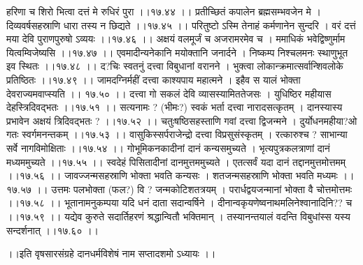 \documentclass[11pt]{book}
\begin{document}
\begin{landscape}
हरिणा च शिरो भित्वा दत्तं मे रुधिरं पुरा ।।१७.४४ ।।
प्रतीच्छितं कपालेन ब्रह्मसम्भवजेन मे ।
दिव्यवर्षसहस्राणि धारा तस्य न छिद्यते ।।१७.४५ ।।
परितुष्टो ऽस्मि तेनाहं कर्मणानेन सुन्दरि ।
वरं दत्तं मया देवि पुराणपुरुषो ऽव्ययः ।।१७.४६ ।।
अक्षयं वलमूर्जं च अजरामरमेव च ।
ममाधिकं भवेद्विष्णुर्माम यित्वम्विजेष्यसि ।।१७.४७ ।।
एवमादीन्यनेकानि मयोक्तानि जनार्दने ।
निष्कम्प निश्चलमनः स्थाणुभूत इव स्थितः ।।१७.४८ ।।
द?चिः स्वतनुं दत्त्वा विबुधानां वरानने ।
भुक्त्वा लोकान्क्रमात्सर्वान्शिवलोके प्रतिष्ठितः ।।१७.४९ ।।
जामदग्निर्महीं दत्त्वा काश्यपाय महात्मने ।
इहैव स यालं भोक्ता देवराज्यमवाप्स्यति ।। १७.५० ।।
दत्त्वा गो सकलं देवि व्यासस्यामिततेजसः ।
युधिष्ठिर महीयास देहस्त्रिदिवद्भतः ।।१७.५१ ।।
सत्यनामः ? (भीमः?) स्वकं भर्ता दत्त्वा नारादसत्कृतम् ।
दानस्यास्य प्रभावेन अक्षयं त्रिदिवद्भतः ? ।।१७.५२ ।।
चतुःषष्ठिसहस्ताणि गवां दत्त्वा द्विजन्मने ।
दुर्योधनमहीया?ओ गतः स्वर्गमनन्तकम् ।।१७.५३ ।।
वासुकिस्सर्पराजेन्द्रो दत्त्वा विप्रसुसंस्कृतम् ।
रत्कारुश्च ? साभान्या सर्वे नागविमोक्षिताः ।।१७.५४ ।।
गोभूमिकनकादीनां दानं कन्यसमुच्यते ।
भृत्यपुत्रकलत्राणां दानं मध्यममुच्यते ।।१७.५५ ।।
स्वदेहं पिसितादीनां दानमुत्तममुच्यते ।
एतत्सर्वं यदा दानं तद्दानमुत्तमोत्तमम् ।।१७.५६ ।।
जावज्जन्मसहस्राणि भोक्ता भवति कन्यसः ।
शतजन्मसहस्राणि भोक्ता भवति मध्यमः ।।१७.५७ ।।
उत्तमः पलभोक्ता (फल?) वि ? जन्मकोटिशतत्रयम् । 
परार्धद्वयजन्मानां भोक्ता वै चोत्तमोत्तमः ।।१७.५८ ।।
भूतानामनुकम्पया यदि धनं दाता सदान्वर्षिने ।
दीनान्वकृयणेष्वनाथमलिनेश्वानादिनि?? च ।।१७.५९ ।।
यद्येव कुरुते सदार्तिहरणं श्रद्धान्वितौ भक्तिमान् ।
तस्यानन्तयालं वदन्ति विबुधांस्स यस्य सन्दर्शनात् ।।१७.६० ।।

 ।।इति वृषसारसंग्रहे दानधर्मविशेषं नाम सप्तादशमो ऽध्यायः ।।





\end{landscape}
\end{document}
